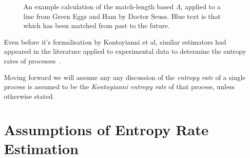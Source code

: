 \begin{figure}[hb]
	\caption{An example calculation of the match-length based $\Lambda_i$ applied to a line from Green Eggs and Ham by Doctor Seuss. {\color{blue} Blue text} is that which has been matched from past to the future. }
\end{figure}


Even before it's formalisation by Kontoyianni et al, similar estimators had appeared in the literature applied to experimental data to determine the entropy rates of processes~\cite{chenUsingDifficultyPrediction1993, chenFastPatternMatching1995, farachEntropyDNAAlgorithms1995, juolaWhatCanWe1997}.


Moving forward we will assume any any discussion of the \emph{entropy rate} of a single process is assumed to be the \emph{Kontoyianni entropy rate} of that process, unless otherwise stated.


\section{Assumptions of Entropy Rate Estimation}





